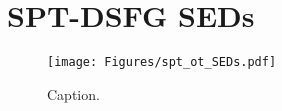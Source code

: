 \chapter{SPT-DSFG SEDs}

\begin{figure}
	\centering
	\texttt{[image: Figures/spt\_ot\_SEDs.pdf]}
	\caption{Caption.}
\end{figure}
